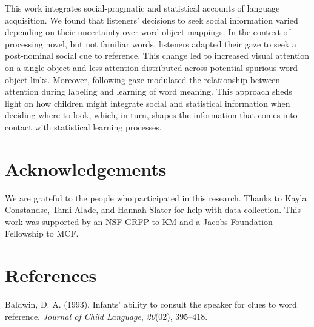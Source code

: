\documentclass[10pt, letterpaper]{article}
\begin{document}
This work integrates social-pragmatic and statistical accounts of
language acquisition. We found that listeners' decisions to seek social
information varied depending on their uncertainty over word-object
mappings. In the context of processing novel, but not familiar words,
listeners adapted their gaze to seek a post-nominal social cue to
reference. This change led to increased visual attention on a single
object and less attention distributed across potential spurious
word-object links. Moreover, following gaze modulated the relationship
between attention during labeling and learning of word meaning. This
approach sheds light on how children might integrate social and
statistical information when deciding where to look, which, in turn,
shapes the information that comes into contact with statistical learning
processes.

\newpage

\vspace{1em}

\vspace{1em}

\hypertarget{acknowledgements}{%
\section{Acknowledgements}\label{acknowledgements}}

We are grateful to the people who participated in this research. Thanks
to Kayla Constandse, Tami Alade, and Hannah Slater for help with data
collection. This work was supported by an NSF GRFP to KM and a Jacobs
Foundation Fellowship to MCF.

\hypertarget{references}{%
\section{References}\label{references}}

\setlength{\parindent}{-0.1in} 
\setlength{\leftskip}{0.125in}

\noindent

\hypertarget{refs}{}
\leavevmode\hypertarget{ref-baldwin1993infants}{}%
Baldwin, D. A. (1993). Infants' ability to consult the speaker for clues
to word reference. \emph{Journal of Child Language}, \emph{20}(02),
395--418.
\end{document}
